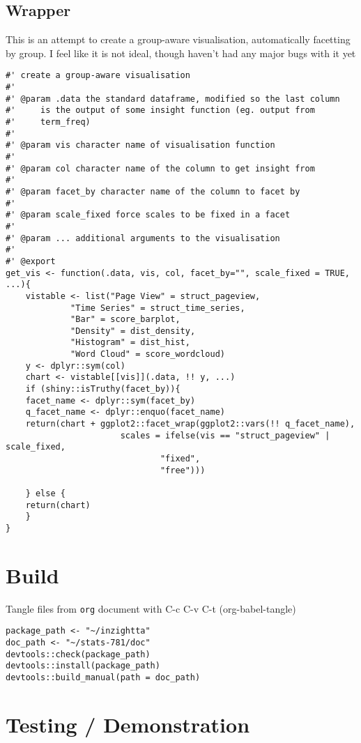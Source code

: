 \documentclass[a4paper, 11pt]{article}
\begin{document}
\subsection{Wrapper}
\label{sec:org16ae8e1}
This is an attempt to create a group-aware visualisation,
automatically facetting by group. I feel like it is not ideal, though
haven't had any major bugs with it yet
\begin{verbatim}
#' create a group-aware visualisation
#'
#' @param .data the standard dataframe, modified so the last column
#'     is the output of some insight function (eg. output from
#'     term_freq)
#'
#' @param vis character name of visualisation function
#'
#' @param col character name of the column to get insight from
#'
#' @param facet_by character name of the column to facet by
#'
#' @param scale_fixed force scales to be fixed in a facet
#'  
#' @param ... additional arguments to the visualisation
#'
#' @export
get_vis <- function(.data, vis, col, facet_by="", scale_fixed = TRUE, ...){
    vistable <- list("Page View" = struct_pageview,
		     "Time Series" = struct_time_series,
		     "Bar" = score_barplot,
		     "Density" = dist_density,
		     "Histogram" = dist_hist,
		     "Word Cloud" = score_wordcloud)
    y <- dplyr::sym(col)
    chart <- vistable[[vis]](.data, !! y, ...)
    if (shiny::isTruthy(facet_by)){
	facet_name <- dplyr::sym(facet_by)
	q_facet_name <- dplyr::enquo(facet_name)
	return(chart + ggplot2::facet_wrap(ggplot2::vars(!! q_facet_name),
					   scales = ifelse(vis == "struct_pageview" | scale_fixed,
							   "fixed",
							   "free")))

    } else {
	return(chart)
    }
}
\end{verbatim}
\section{Build}
\label{sec:org3b0f4bc}

Tangle files from \texttt{org} document with C-c C-v C-t (org-babel-tangle)

\begin{verbatim}
package_path <- "~/inzightta"
doc_path <- "~/stats-781/doc"
devtools::check(package_path)
devtools::install(package_path)
devtools::build_manual(path = doc_path)
\end{verbatim}

\section{Testing / Demonstration}
\label{sec:orgc89c573}
\end{document}
